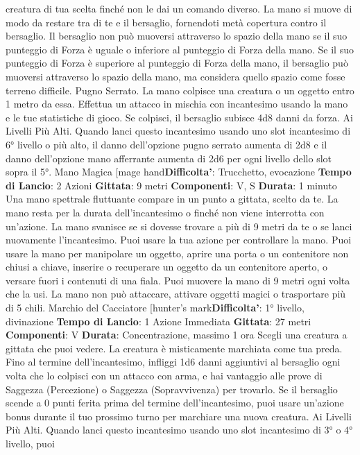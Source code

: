 \begin{multicols}{2}
creatura di tua scelta finché non le dai un comando
diverso. La mano si muove di modo da restare tra di te
e il bersaglio, fornendoti metà copertura contro il
bersaglio. Il bersaglio non può muoversi attraverso lo
spazio della mano se il suo punteggio di Forza è uguale
o inferiore al punteggio di Forza della mano. Se il suo
punteggio di Forza è superiore al punteggio di Forza
della mano, il bersaglio può muoversi attraverso lo
spazio della mano, ma considera quello spazio come
fosse terreno difficile.
Pugno Serrato. La mano colpisce una creatura o un
oggetto entro 1 metro da essa. Effettua un attacco in
mischia con incantesimo usando la mano e le tue
statistiche di gioco. Se colpisci, il bersaglio subisce 4d8
danni da forza.
Ai Livelli Più Alti. Quando lanci questo incantesimo
usando uno slot incantesimo di 6° livello o più alto, il
danno dell’opzione pugno serrato aumenta di 2d8 e il
danno dell’opzione mano afferrante aumenta di 2d6 per
ogni livello dello slot sopra il 5°.
Mano Magica
[mage hand\textbf{Difficolta'}:
Trucchetto, evocazione
\textbf{Tempo di Lancio}: 2 Azioni
\textbf{Gittata}: 9 metri
\textbf{Componenti}: V, S
\textbf{Durata}: 1 minuto
Una mano spettrale fluttuante compare in un punto a
gittata, scelto da te. La mano resta per la durata
dell’incantesimo o finché non viene interrotta con
un’azione. La mano svanisce se si dovesse trovare a
più di 9 metri da te o se lanci nuovamente
l’incantesimo.
Puoi usare la tua azione per controllare la mano. Puoi
usare la mano per manipolare un oggetto, aprire una
porta o un contenitore non chiusi a chiave, inserire o
recuperare un oggetto da un contenitore aperto, o
versare fuori i contenuti di una fiala. Puoi muovere la
mano di 9 metri ogni volta che la usi.
La mano non può attaccare, attivare oggetti magici o
trasportare più di 5 chili.
Marchio del Cacciatore
[hunter’s mark\textbf{Difficolta'}:
1° livello, divinazione
\textbf{Tempo di Lancio}: 1 Azione Immediata
\textbf{Gittata}: 27 metri
\textbf{Componenti}: V
\textbf{Durata}: Concentrazione, massimo 1 ora
Scegli una creatura a gittata che puoi vedere. La
creatura è misticamente marchiata come tua preda.
Fino al termine dell’incantesimo, infliggi 1d6 danni
aggiuntivi al bersaglio ogni volta che lo colpisci con un
attacco con arma, e hai vantaggio alle prove di
Saggezza (Percezione) o Saggezza (Sopravvivenza)
per trovarlo. Se il bersaglio scende a 0 punti ferita prima
del termine dell’incantesimo, puoi usare un’azione
bonus durante il tuo prossimo turno per marchiare una
nuova creatura.
Ai Livelli Più Alti. Quando lanci questo incantesimo
usando uno slot incantesimo di 3° o 4° livello, puoi

\end{multicols}
